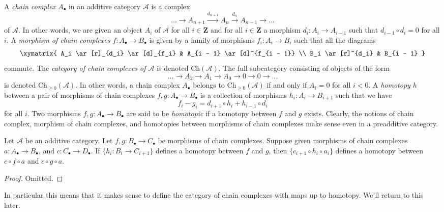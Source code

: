 \medskip\noindent
A {\it chain complex $A_\bullet$} in an additive category $\mathcal{A}$
is a complex
$$
\ldots \to
A_{n + 1} \xrightarrow{d_{n + 1}}
A_n \xrightarrow{d_n}
A_{n - 1} \to
\ldots
$$
of $\mathcal{A}$. In other words, we are given an object $A_i$ of
$\mathcal{A}$ for all $i \in \mathbf{Z}$ and for
all $i \in \mathbf{Z}$ a morphism $d_i : A_i \to A_{i - 1}$ such that
$d_{i - 1} \circ d_i = 0$ for all $i$. A {\it morphism of chain
complexes $f : A_\bullet \to B_\bullet$} is given by a
family of morphisms $f_i : A_i \to B_i$ such that all
the diagrams
$$
\xymatrix{
A_i \ar[r]_{d_i} \ar[d]_{f_i} & A_{i - 1} \ar[d]^{f_{i - 1}} \\
B_i \ar[r]^{d_i} & B_{i - 1}
}
$$
commute. The {\it category of chain complexes of $\mathcal{A}$}
is denoted $\text{Ch}(\mathcal{A})$. The full subcategory consisting
of objects of the form
$$
\ldots \to A_2 \to A_1 \to A_0 \to 0 \to 0 \to \ldots
$$
is denoted $\text{Ch}_{\geq 0}(\mathcal{A})$.
In other words, a chain complex $A_\bullet$ belongs to
$\text{Ch}_{\geq 0}(\mathcal{A})$ if and only if
$A_i = 0$ for all $i < 0$.
A {\it homotopy $h$} between a pair of morphisms
of chain complexes $f, g : A_\bullet \to B_\bullet$
is a collection of morphisms $h_i : A_i \to B_{i + 1}$
such that we have
$$
f_i - g_i = d_{i + 1} \circ h_i + h_{i - 1} \circ d_i
$$
for all $i$.
Two morphisms $f, g : A_\bullet \to B_\bullet$ are
said to be {\it homotopic} if a homotopy between $f$
and $g$ exists.
Clearly, the notions of chain complex, morphism of
chain complexes, and homotopies between morphisms of chain complexes
make sense even in a preadditive category.

\begin{lemma}
\label{lemma-compose-homotopy}
Let $\mathcal{A}$ be an additive category.
Let $f, g : B_\bullet \to C_\bullet$ be morphisms
of chain complexes. Suppose given morphisms of chain
complexes $a : A_\bullet \to B_\bullet$, and
$c : C_\bullet \to D_\bullet$.
If $\{h_i : B_i \to C_{i + 1}\}$ defines a homotopy
between $f$ and $g$, then $\{c_{i + 1} \circ h_i \circ a_i\}$
defines a homotopy between $c \circ f \circ a$ and
$c \circ g \circ a$.
\end{lemma}

\begin{proof}
Omitted.
\end{proof}

\noindent
In particular this means that it makes sense to define
the category of chain complexes with maps up to homotopy.
We'll return to this later.

